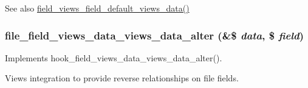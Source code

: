 \begin{DoxySeeAlso}{See also}
\hyperlink{field_8views_8inc_adbb71dc4cb1642151e243f305ba34223}{field\_\-views\_\-field\_\-default\_\-views\_\-data()} 
\end{DoxySeeAlso}
\hypertarget{file_8views_8inc_a79ca6a104321acf7e32c0f6d6950f70e}{
\subsubsection[{file\_\-field\_\-views\_\-data\_\-views\_\-data\_\-alter}]{\setlength{\rightskip}{0pt plus 5cm}file\_\-field\_\-views\_\-data\_\-views\_\-data\_\-alter (\&\$ {\em data}, \/  \$ {\em field})}}
\label{file_8views_8inc_a79ca6a104321acf7e32c0f6d6950f70e}
Implements hook\_\-field\_\-views\_\-data\_\-views\_\-data\_\-alter().

Views integration to provide reverse relationships on file fields. 